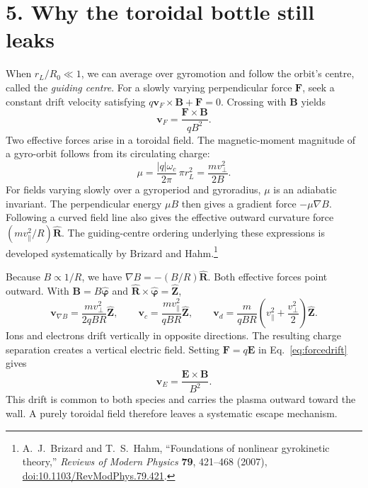 \documentclass[11pt]{article}
\begin{document}
\section*{5. Why the toroidal bottle still leaks}
When $r_L/R_0\ll1$, we can average over gyromotion and follow the orbit's centre,
called the \emph{guiding centre}. For a slowly varying perpendicular force $\mathbf F$,
seek a constant drift velocity satisfying
$q\mathbf v_F\times\mathbf B+\mathbf F=0$. Crossing with $\mathbf B$ yields
\begin{equation}
 \mathbf v_F=\frac{\mathbf F\times\mathbf B}{qB^2}.
 \label{eq:forcedrift}
\end{equation}
Two effective forces arise in a toroidal field. The magnetic-moment magnitude of a
gyro-orbit follows from its circulating charge:
\[
 \mu=\frac{|q|\omega_c}{2\pi}\,\pi r_L^2=\frac{mv_\perp^2}{2B}.
\]
For fields varying slowly over a gyroperiod and gyroradius, $\mu$ is an adiabatic
invariant. The perpendicular energy $\mu B$ then gives a gradient force
$-\mu\nabla B$. Following a curved field line also gives the effective outward
curvature force $(mv_\parallel^2/R)\hat{\mathbf R}$. The guiding-centre ordering
underlying these expressions is developed systematically by Brizard and Hahm.\footnote{
A.~J.~Brizard and T.~S.~Hahm, ``Foundations of nonlinear gyrokinetic theory,''
\emph{Reviews of Modern Physics} \textbf{79}, 421--468 (2007),
\href{https://doi.org/10.1103/RevModPhys.79.421}{doi:10.1103/RevModPhys.79.421}.}

Because $B\propto1/R$, we have $\nabla B=-(B/R)\hat{\mathbf R}$.
Both effective forces point outward. With $\mathbf B=B\hat{\boldsymbol\varphi}$
and $\hat{\mathbf R}\times\hat{\boldsymbol\varphi}=\hat{\mathbf Z}$,
\begin{equation}
 \mathbf v_{\nabla B}=\frac{mv_\perp^2}{2qBR}\hat{\mathbf Z},\qquad
 \mathbf v_c=\frac{mv_\parallel^2}{qBR}\hat{\mathbf Z},\qquad
 \mathbf v_d=\frac{m}{qBR}\left(v_\parallel^2+\frac{v_\perp^2}{2}\right)\hat{\mathbf Z}.
 \label{eq:toroidaldrift}
\end{equation}
Ions and electrons drift vertically in opposite directions. The resulting charge
separation creates a vertical electric field. Setting $\mathbf F=q\mathbf E$ in
Eq.~\eqref{eq:forcedrift} gives
\begin{equation}
 \mathbf v_E=\frac{\mathbf E\times\mathbf B}{B^2}.
 \label{eq:exb}
\end{equation}
This drift is common to both species and carries the plasma outward toward the wall.
A purely toroidal field therefore leaves a systematic escape mechanism.
\end{document}
